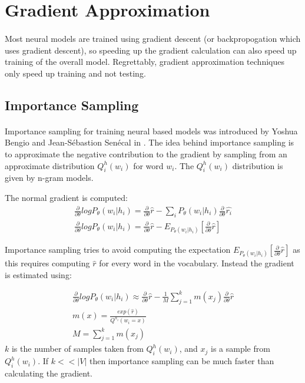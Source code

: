 \section{Gradient Approximation}
\paragraph{}
Most neural models are trained using gradient descent (or backpropogation which uses gradient descent), so speeding up the gradient calculation can also speed up training of the overall model. Regrettably, gradient approximation techniques only speed up training and not testing. 

\subsection{Importance Sampling}
\paragraph{}
Importance sampling for training neural based models was introduced by Yoshua Bengio and Jean-S\'{e}bastion Sen\'{e}cal in \cite{BengioSenecal2003}.
The idea behind importance sampling is to approximate the negative contribution to the gradient by sampling from an approximate distribution $Q^h_i(w_i)$ for word $w_i$. The $Q^h_i(w_i)$ distribution is given by n-gram models. 

The normal gradient is computed:
\begin{align}
\frac{\partial}{\partial \theta} log P_{\theta}(w_i| h_i) = \frac{\partial}{\partial \theta} \hat{r} - \sum_i P_{\theta}(w_i| h_i) \frac{\partial}{\partial \theta} \hat{r_i} 
\\ \frac{\partial}{\partial \theta} log P_{\theta}(w_i| h_i) = \frac{\partial}{\partial \theta} \hat{r} - E_{P_{\theta}(w_i| h_i)} \left[ \frac{\partial}{\partial \theta} \hat{r} \right]
\end{align}

Importance sampling tries to avoid computing the expectation $E_{P_{\theta}(w_i| h_i)} \left[ \frac{\partial}{\partial \theta} \hat{r} \right]$ as this requires computing $\hat{r}$ for every word in the vocabulary. Instead the gradient is estimated using:

\begin{align}
\frac{\partial}{\partial \theta} log P_{\theta}(w_i| h_i) \approx \frac{\partial}{\partial \theta} \hat{r} - \frac{1}{M} \sum_{j=1}^k m(x_j) \frac{\partial}{\partial \theta} \hat{r}
\\ m(x) = \frac{exp(\hat{r})}{Q^{h_i}(w_i=x)}
\\ M= \sum_{j=1}^k m(x_j)
\end{align}
$k$ is the number of samples taken from $Q^h_i(w_i)$, and $x_j$ is a sample from  $Q^h_i(w_i)$. If $k << |V|$ then importance sampling can be much faster than calculating the gradient.

